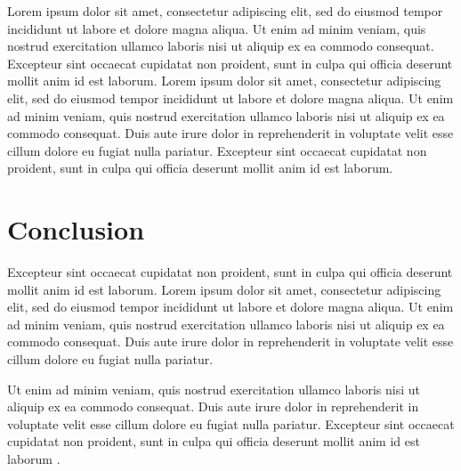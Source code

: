 \documentclass[english]{sbcreviews-2025}%
\begin{document}
Lorem ipsum dolor sit amet, consectetur adipiscing elit, sed do eiusmod tempor incididunt ut labore et dolore magna aliqua. Ut enim ad minim veniam, quis nostrud exercitation ullamco laboris nisi ut aliquip ex ea commodo consequat. Excepteur sint occaecat cupidatat non proident, sunt in culpa qui officia deserunt mollit anim id est laborum. Lorem ipsum dolor sit amet, consectetur adipiscing elit, sed do eiusmod tempor incididunt ut labore et dolore magna aliqua. Ut enim ad minim veniam, quis nostrud exercitation ullamco laboris nisi ut aliquip ex ea commodo consequat. Duis aute irure dolor in reprehenderit in voluptate velit esse cillum dolore eu fugiat nulla pariatur. Excepteur sint occaecat cupidatat non proident, sunt in culpa qui officia deserunt mollit anim id est laborum.

\section{Conclusion}

Excepteur sint occaecat cupidatat non proident, sunt in culpa qui officia deserunt mollit anim id est laborum. Lorem ipsum dolor sit amet, consectetur adipiscing elit, sed do eiusmod tempor incididunt ut labore et dolore magna aliqua. Ut enim ad minim veniam, quis nostrud exercitation ullamco laboris nisi ut aliquip ex ea commodo consequat. Duis aute irure dolor in reprehenderit in voluptate velit esse cillum dolore eu fugiat nulla pariatur. 

Ut enim ad minim veniam, quis nostrud exercitation ullamco laboris nisi ut aliquip ex ea commodo consequat. Duis aute irure dolor in reprehenderit in voluptate velit esse cillum dolore eu fugiat nulla pariatur. Excepteur sint occaecat cupidatat non proident, sunt in culpa qui officia deserunt mollit anim id est laborum \citep{ref5}.
\end{document}
